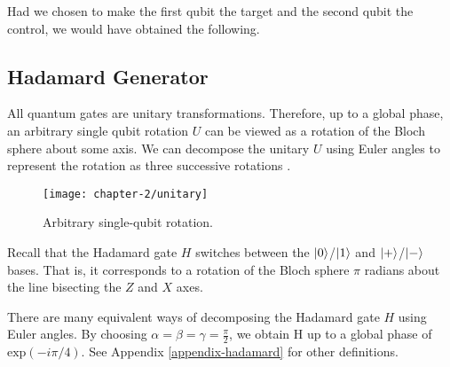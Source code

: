 Had we chosen to make the first qubit the target and the second qubit the control, we would have obtained the following.


\subsection{Hadamard Generator}

All quantum gates are unitary transformations. Therefore, up to a global phase, an arbitrary single qubit rotation $U$ can be viewed as a rotation of the Bloch sphere about some axis. We can decompose the unitary $U$ using Euler angles to represent the rotation as three successive rotations \cite{Wetering2020}.

\begin{figure}[H]
    \centering
    \texttt{[image: chapter-2/unitary]}
    \caption{Arbitrary single-qubit rotation.}
\end{figure}

Recall that the Hadamard gate $H$ switches between the $\ket 0$/$\ket 1$ and $\ket +$/$\ket -$ bases. That is, it corresponds to a rotation of the Bloch sphere $\pi$ radians about the line bisecting the $Z$ and $X$ axes.

There are many equivalent ways of decomposing the Hadamard gate $H$ using Euler angles. By choosing $\alpha = \beta = \gamma = \frac{\pi}{2}$, we obtain H up to a global phase of $\text{exp}(-i\pi/4)$. See Appendix \ref{appendix-hadamard} for other definitions.

